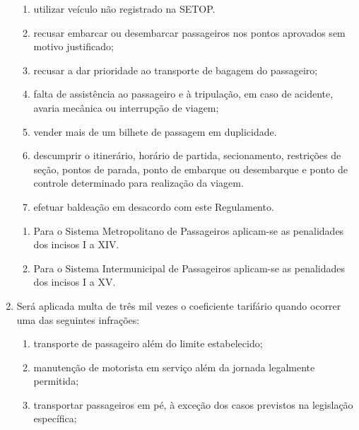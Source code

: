 \begin{enumerate}[resume, label=Art. \arabic*]
\begin{enumerate}[label=\roman*.]
\item utilizar veículo não registrado na SETOP.

\item recusar embarcar ou desembarcar passageiros nos pontos aprovados sem motivo justificado;

\item recusar a dar prioridade ao transporte de bagagem do passageiro;

\item falta de assistência ao passageiro e à tripulação, em caso de acidente, avaria mecânica ou interrupção de viagem;

\item vender mais de um bilhete de passagem em duplicidade.

\item descumprir o itinerário, horário de partida, secionamento, restrições de seção, pontos de parada, ponto de embarque ou desembarque e ponto de controle determinado para realização da viagem.

\item efetuar baldeação em desacordo com este Regulamento.

\end{enumerate}

\begin{enumerate}[label= \S \arabic*] %

\item Para o Sistema Metropolitano de Passageiros aplicam-se as penalidades dos incisos I a XIV.

\item Para o Sistema Intermunicipal de Passageiros aplicam-se as penalidades dos incisos I a XV.

\end{enumerate}

\item Será aplicada multa de três mil vezes o coeficiente tarifário quando ocorrer uma das seguintes infrações:

\begin{enumerate}[label=\roman*.]

\item transporte de passageiro além do limite estabelecido;

\item manutenção de motorista em serviço além da jornada legalmente permitida;

\item transportar passageiros em pé, à exceção dos casos previstos na legislação específica;


\end{enumerate}
\end{enumerate}
